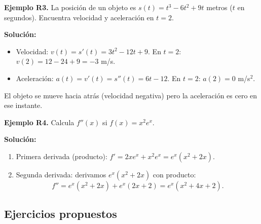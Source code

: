 \documentclass[12pt, a4paper]{article}
\begin{document}
\newpage

\textbf{Ejemplo R3.} La posición de un objeto es $s(t) = t^3 - 6t^2 + 9t$ metros ($t$ en segundos). Encuentra velocidad y aceleración en $t = 2$.

\begin{cuadrosolucion}
  \textbf{Solución:}
  \begin{itemize}
    \item Velocidad: $v(t) = s'(t) = 3t^2 - 12t + 9$. En $t = 2$: $v(2) = 12 - 24 + 9 = -3$ m/s.
    \item Aceleración: $a(t) = v'(t) = s''(t) = 6t - 12$. En $t = 2$: $a(2) = 0$ m/s$^2$.
  \end{itemize}
  El objeto se mueve hacia atrás (velocidad negativa) pero la aceleración es cero en ese instante.
\end{cuadrosolucion}

\textbf{Ejemplo R4.} Calcula $f''(x)$ si $f(x) = x^2 e^x$.

\begin{cuadrosolucion}
  \textbf{Solución:}
  \begin{enumerate}
    \item Primera derivada (producto): $f' = 2x e^x + x^2 e^x = e^x(x^2 + 2x)$.
    \item Segunda derivada: derivamos $e^x(x^2 + 2x)$ con producto:
          $$f'' = e^x(x^2 + 2x) + e^x(2x + 2) = e^x(x^2 + 4x + 2).$$
  \end{enumerate}
\end{cuadrosolucion}

\subsection{Ejercicios propuestos}
\end{document}
